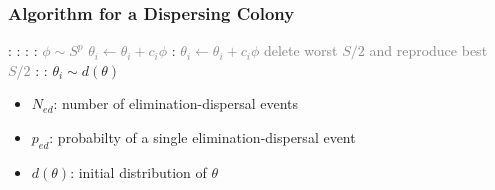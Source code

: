 \documentclass{beamer}
\begin{document}
\begin{frame}
\frametitle{Algorithm for a Dispersing Colony}
\begin{algorithmic}[1]
:
  :
    \For {\textcolor{gray}{$j \gets 1 \dots N_c $}}:
      \For {\textcolor{gray}{$i \gets 1 \dots S$}}:
        \State \textcolor{gray}{$\phi \sim S^p$}
        \State \textcolor{gray}{$\theta_i \gets \theta_i + c_i \phi$}
        :
          \State \textcolor{gray}{$\theta_i \gets \theta_i + c_i \phi$}
        \EndWhile
      \EndFor
    \EndFor
    \State \textcolor{gray}{delete worst $S/2$ and reproduce best $S/2$}
  \EndFor
  :
    :
      \State $\theta_i \sim d(\theta)$
    \EndIf
  \EndFor
\EndFor
\end{algorithmic}
\begin{itemize}
  \item $N_{ed}$: number of elimination-dispersal events
  \item $p_{ed}$: probabilty of a single elimination-dispersal event
  \item $d(\theta)$: initial distribution of $\theta$
\end{itemize}
\end{frame}
\end{document}
